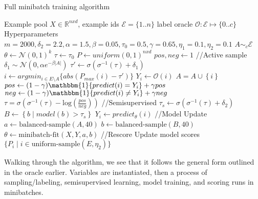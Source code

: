 \documentclass{article}
\begin{document}
\begin{algorithm}
\caption{Full minibatch training algorithm}
\label{alg:the_alg}
\begin{algorithmic}[1]
\Require Example pool $X\in\mathbb{R}^{nxd}$, example ids $\mathcal{E}=\{1..n\}$
\Require label oracle $\mathcal{O}:\mathcal{E}\mapsto\{0..c\}$
\State Hyperparameters $m=2000, \delta_2=2.2, \alpha=1.5, \beta=0.05, \tau_0=0.5, \gamma=0.65, \eta_1=0.1,\eta_2=0.1$ 
\State $A \sim_{c} \mathcal{E} $ 
\State $\theta \leftarrow \mathcal{N}(0,1)^{k}$ 
\State $\tau \leftarrow \tau_0 $ 
\State $P \leftarrow uniform(0,1)^{nxd}$ 
\State $pos,neg \leftarrow 1$ 
\State 
\State //Active
 
\State sample $\delta_1 \sim  \mathcal{N}(0,\alpha e^{-\beta | A | })$ 
\State $\tau' \leftarrow \sigma(\sigma^{-1}(\tau)+\delta_1)$ 
\State $i \leftarrow argmin_{i \in E \setminus A} \{ abs(P_{max}(i) - \tau')\}$ 
\State $Y_i \leftarrow \mathcal{O}(i)$ 
\State $A = A \cup \left\{ i \right\}$ 
\State $pos \leftarrow (1-\gamma)\mathbbm{1}\{predict(i)=Y_i\} + \gamma pos$
\State $neg \leftarrow (1-\gamma)\mathbbm{1}\{predict(i) \neq Y_i\} + \gamma neg$
\State $\tau = \sigma(\sigma^{-1}(\tau) - \mathrm{ log}(\frac{pos}{neg}))$ 
\EndIf
\State 
\State //Semisupervised
\State $\tau_s \leftarrow \sigma(\sigma^{-1}(\tau)+\delta_2)$
\State $B \leftarrow \left\{b \mid model(b)> \tau_s \right\}$ 
\State $Y_i \leftarrow predict_{\theta} (i)$
\EndFor
\State
\State //Model Update
\State $a \leftarrow \textrm{balanced-sample}(A,40)$
\State $b \leftarrow \textrm{balanced-sample}(B,40)$
\State $\theta \leftarrow \textrm{minibatch-fit}(X,Y,a,b)$
\State
\State //Rescore
\State Update model scores $\{ P_i \mid i \in \textrm{uniform-sample}(E,\eta_2) \}$
\EndFor
\end{algorithmic}
\end{algorithm}

Walking through the algorithm, we see that it follows the general form outlined in the oracle earlier.  Variables are instantiated, then a process of sampling/labeling, semisupervised learning, model training, and scoring runs in minibatches.  
\end{document}
